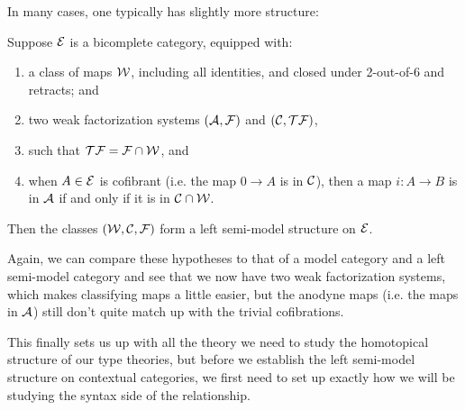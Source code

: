 \documentclass{amsart}
\begin{document}
In many cases, one typically has slightly more structure:
\begin{lem}\cite[Lem. 6.7]{KL18}\label{lem:semi-model struct}
    Suppose $\mathcal{E}$ is a bicomplete category, equipped with:
    \begin{enumerate}
        \item a class of maps $\mathcal{W}$, including all identities, and closed under 2-out-of-6 and retracts; and
        \item two weak factorization systems $(\mathcal{A},\mathcal{F})$ and $(\mathcal{C},\mathcal{T}\mathcal{F})$,
        \item such that $\mathcal{T}\mathcal{F}=\mathcal{F}\cap\mathcal{W}$, and
        \item when $A\in\mathcal{E}$ is cofibrant (i.e. the map $0\to A$ is in $\mathcal{C}$), then a map $i\colon A\to B$ is in $\mathcal{A}$ if and only if it is in $\mathcal{C}\cap\mathcal{W}$.
    \end{enumerate}
    Then the classes $(\mathcal{W},\mathcal{C},\mathcal{F})$ form a left semi-model structure on $\mathcal{E}$.
\end{lem}
Again, we can compare these hypotheses to that of a model category and a left semi-model category and see that we now have two weak factorization systems, which makes classifying maps a little easier, but the anodyne maps (i.e. the maps in $\mathcal{A}$) still don't quite match up with the trivial cofibrations.

This finally sets us up with all the theory we need to study the homotopical structure of our type theories, but before we establish the left semi-model structure on contextual categories, we first need to set up exactly how we will be studying the syntax side of the relationship.
\end{document}
